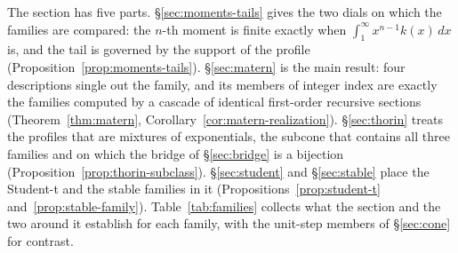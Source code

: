 The section has five parts. \S\ref{sec:moments-tails} gives the two dials on which the families
are compared: the $n$-th moment is finite exactly when $\int_1^\infty x^{n-1}k(x)\,dx$ is, and
the tail is governed by the support of the profile (Proposition~\ref{prop:moments-tails}).
\S\ref{sec:matern} is the main result: four descriptions single out the \Matern{} family, and
its members of integer index are exactly the families computed by a cascade of identical
first-order recursive sections (Theorem~\ref{thm:matern},
Corollary~\ref{cor:matern-realization}). \S\ref{sec:thorin} treats the profiles that are
mixtures of exponentials, the subcone that contains all three families and on which the
bridge of \S\ref{sec:bridge} is a bijection (Proposition~\ref{prop:thorin-subclass}).
\S\ref{sec:student} and \S\ref{sec:stable} place the Student-t and the stable families in it
(Propositions~\ref{prop:student-t} and~\ref{prop:stable-family}). Table~\ref{tab:families}
collects what the section and the two around it establish for each family, with the unit-step
members of \S\ref{sec:cone} for contrast.

